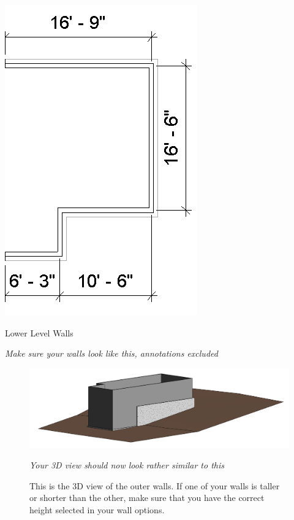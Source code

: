 \documentclass{tufte-book} %
\begin{document}
\begin{enumerate}
	\begin{marginfigure}
		\includegraphics[width=\linewidth]{revitlowerlevelwalls.png}
		\caption{Lower Level Walls}
		\emph{Make sure your walls look like this, annotations excluded}
		\label{fig:revlowlvlwalls}
	\end{marginfigure}
	
	\clearpage
	
	\begin{figure}
		\includegraphics[width=\linewidth]{revitthreedouterwalls.png}
		\caption[Exterior walls 3D view]{This is the 3D view of the outer walls. If one of your walls is taller or shorter than the other, make sure that you have the correct height selected in your wall options.}
		\emph{Your 3D view should now look rather similar to this}
		\label{fig:revthreedoutwalls}
	\end{figure}
	

\end{enumerate}
\end{document}
